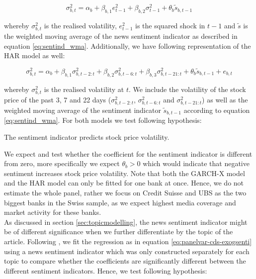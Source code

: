 \begin{equation}
	\sigma^2_{b,t} = \alpha_b + \beta_{b,1}e^2_{t-1} + \beta_{b,2}\sigma^2_{t-1} + \theta_b\tilde{s}_{b,t-1}
\end{equation}

whereby $\sigma^2_{b,t}$ is the realised volatility, $e^2_{t-1}$ is the squared shock in $t-1$ and $\tilde{s}$ is the weighted moving average of the news sentiment indicator as described in equation \ref{eq:sentind_wma}. Additionally, we have following representation of the HAR model as well:

\begin{equation}
	\sigma^2_{b,t} = \alpha_b + \beta_{b,1}\sigma^2_{b,t-2:t} + \beta_{b,2}\sigma^2_{b,t-6:t} + \beta_{b,3}\sigma^2_{b,t-21:t} + \theta_b \tilde{s}_{b,t-1} + e_{b,t}
\end{equation}

whereby $\sigma^2_{b,t}$ is the realised volatility at $t$. We include the volatility of the stock price of the past 3, 7 and 22 days ($\sigma^2_{b,t-2:t}$, $\sigma^2_{b,t-6:t}$ and $\sigma^2_{b,t-21:t}$) as well as the weighted moving average of the sentiment indicator $\tilde{s}_{b,t-1}$ according to equation \ref{eq:sentind_wma}. For both models we test following hypothesis:

\begin{hyp}
	The sentiment indicator predicts stock price volatility.
\end{hyp} 

We expect and test whether the coefficient for the sentiment indicator is different from zero, more specifically we expect $\theta_b>0$ which would indicate that negative sentiment increases stock price volatility. Note that both the GARCH-X model and the HAR model can only be fitted for one bank at once. Hence, we do not estimate the whole panel, rather we focus on Credit Suisse and UBS as the two biggest banks in the Swiss sample, as we expect highest media coverage and market activity for these banks. \\

As discussed in section \ref{sec:topicmodelling}, the news sentiment indicator might be of different significance when we further differentiate by the topic of the article. Following \cite{roeder2020}, we fit the regression as in equation \ref{eq:panelvar-cds-exogsenti} using a news sentiment indicator which was only constructed separately for each topic to compare whether the coefficients are significantly different between the different sentiment indicators. Hence, we test following hypothesis:

